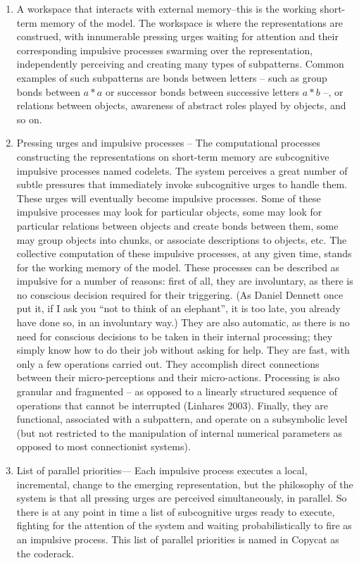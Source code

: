 \begin{enumerate}

\item A workspace that interacts with external memory--this is the working short-term memory of the model.  The workspace is where the representations are construed, with innumerable pressing urges waiting for attention and their corresponding impulsive processes swarming over the representation, independently perceiving and creating many types of subpatterns.  Common examples of such subpatterns are bonds between letters – such as group bonds between $a*a$ or successor bonds between successive letters $a*b$ –, or relations between objects, awareness of abstract roles played by objects, and so on. 

\item Pressing urges and impulsive processes – The computational processes constructing the representations on short-term memory are subcognitive impulsive processes named codelets.  The system perceives a great number of subtle pressures that immediately invoke subcognitive urges to handle them.  These urges will eventually become impulsive processes. Some of these impulsive processes may look for particular objects, some may look for particular relations between objects and create bonds between them, some may group objects into chunks, or associate descriptions to objects, etc.  The collective computation of these impulsive processes, at any given time, stands for the working memory of the model.  These processes can be described as impulsive for a number of reasons: first of all, they are involuntary, as there is no conscious decision required for their triggering.  (As Daniel Dennett once put it, if I ask you “not to think of an elephant”, it is too late, you already have done so, in an involuntary way.)  They are also automatic, as there is no need for conscious decisions to be taken in their internal processing; they simply know how to do their job without asking for help. They are fast, with only a few operations carried out.  They accomplish direct connections between their micro-perceptions and their micro-actions. Processing is also granular and fragmented – as opposed to a linearly structured sequence of operations that cannot be interrupted (Linhares 2003). Finally, they are functional, associated with a subpattern, and operate on a subsymbolic level (but not restricted to the manipulation of internal numerical parameters as opposed to most connectionist systems).  


\item List of parallel priorities— Each impulsive process executes a local, incremental, change to the emerging representation, but the philosophy of the system is that all pressing urges are perceived simultaneously, in parallel.  So there is at any point in time a list of subcognitive urges ready to execute, fighting for the attention of the system and waiting probabilistically to fire as an impulsive process. This list of parallel priorities is named in Copycat as the coderack.  


\end{enumerate}
